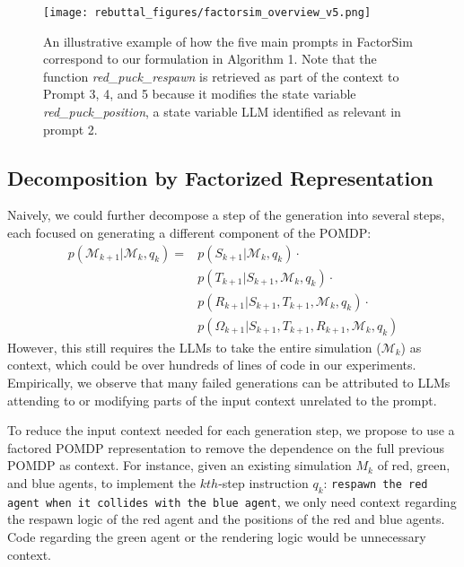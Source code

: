 \documentclass{article}
\theoremstyle{plain}
\theoremstyle{definition}
\theoremstyle{remark}
\begin{document}
\vspace{-1mm}

\begin{figure}[!t]
  \centering
\texttt{[image: rebuttal\_figures/factorsim\_overview\_v5.png]}
\caption{An illustrative example of how the five main prompts in FactorSim correspond to our formulation in Algorithm 1. Note that the function \textit{red\_puck\_respawn} is retrieved as part of the context to Prompt 3, 4, and 5 because it modifies the state variable \textit{red\_puck\_position}, a state variable LLM identified as relevant in prompt 2.}
   \label{fig:method_illustrative_overview}
\end{figure}
\subsection{Decomposition by Factorized Representation}
Naively, we could further decompose a step of the generation into several steps, each focused on generating a different component of the POMDP:
\begin{align}
p(\mathcal{M}_{k+1} | \mathcal{M}_k, q_k) =  & p(S_{k+1} | \mathcal{M}_k, q_k) \cdot \label{eq:naive_state}\\
   & p(T_{k+1} | S_{k+1},  \mathcal{M}_k, q_k) \cdot \\
   & p(R_{k+1} | S_{k+1}, T_{k+1}, \mathcal{M}_k, q_k) \cdot \\
   & p(\Omega_{k+1} | S_{k+1}, T_{k+1}, R_{k+1}, \mathcal{M}_k, q_k) \label{eq:naive_rendering}
\end{align}
However, this still requires the LLMs to take the entire simulation ($\mathcal{M}_k$) as context, which could be over hundreds of lines of code in our experiments. Empirically, we observe that many failed generations can be attributed to LLMs attending to or modifying parts of the input context unrelated to the prompt.





To reduce the input context needed for each generation step, we propose to use a factored POMDP representation to remove the dependence on the full previous POMDP as context. For instance, given an existing simulation $M_k$ of red, green, and blue agents, to implement the $kth$-step instruction $q_k$: \texttt{respawn the red agent when it collides with the blue agent}, we only need context regarding the respawn logic of the red agent and the positions of the red and blue agents. Code regarding the green agent or the rendering logic would be unnecessary context.
\end{document}
